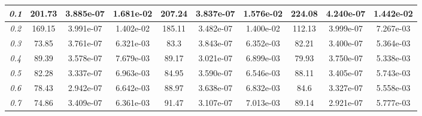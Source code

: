 \documentclass[conference]{IEEEtran}
\begin{document}
\begin{table*}[!htbp]
{\begin{tabular}{llllllllll}
    \multicolumn{1}{|c|}{\textit{ 0.1 }} & \multicolumn{1}{c|}{ 201.73 } & \multicolumn{1}{c|}{ 3.885e-07 } & \multicolumn{1}{c|}{ 1.681e-02 }& \multicolumn{1}{c|}{ 207.24 } & \multicolumn{1}{c|}{ 3.837e-07 } & \multicolumn{1}{c|}{ 1.576e-02 }& \multicolumn{1}{c|}{ 224.08 } & \multicolumn{1}{c|}{ 4.240e-07 } & \multicolumn{1}{c|}{ 1.442e-02 } \\ \hline
    \multicolumn{1}{|c|}{\textit{ 0.2 }} & \multicolumn{1}{c|}{ 169.15 } & \multicolumn{1}{c|}{ 3.991e-07 } & \multicolumn{1}{c|}{ 1.402e-02 }& \multicolumn{1}{c|}{ 185.11 } & \multicolumn{1}{c|}{ 3.482e-07 } & \multicolumn{1}{c|}{ 1.400e-02 }& \multicolumn{1}{c|}{ 112.13 } & \multicolumn{1}{c|}{ 3.999e-07 } & \multicolumn{1}{c|}{ 7.267e-03 } \\ \hline
    \multicolumn{1}{|c|}{\textit{ 0.3 }} & \multicolumn{1}{c|}{ 73.85 } & \multicolumn{1}{c|}{ 3.761e-07 } & \multicolumn{1}{c|}{ 6.321e-03 }& \multicolumn{1}{c|}{ 83.3 } & \multicolumn{1}{c|}{ 3.843e-07 } & \multicolumn{1}{c|}{ 6.352e-03 }& \multicolumn{1}{c|}{ 82.21 } & \multicolumn{1}{c|}{ 3.400e-07 } & \multicolumn{1}{c|}{ 5.364e-03 } \\ \hline
    \multicolumn{1}{|c|}{\textit{ 0.4 }} & \multicolumn{1}{c|}{ 89.39 } & \multicolumn{1}{c|}{ 3.578e-07 } & \multicolumn{1}{c|}{ 7.679e-03 }& \multicolumn{1}{c|}{ 89.17 } & \multicolumn{1}{c|}{ 3.021e-07 } & \multicolumn{1}{c|}{ 6.899e-03 }& \multicolumn{1}{c|}{ 79.93 } & \multicolumn{1}{c|}{ 3.750e-07 } & \multicolumn{1}{c|}{ 5.338e-03 } \\ \hline
    \multicolumn{1}{|c|}{\textit{ 0.5 }} & \multicolumn{1}{c|}{ 82.28 } & \multicolumn{1}{c|}{ 3.337e-07 } & \multicolumn{1}{c|}{ 6.963e-03 }& \multicolumn{1}{c|}{ 84.95 } & \multicolumn{1}{c|}{ 3.590e-07 } & \multicolumn{1}{c|}{ 6.546e-03 }& \multicolumn{1}{c|}{ 88.11 } & \multicolumn{1}{c|}{ 3.405e-07 } & \multicolumn{1}{c|}{ 5.743e-03 } \\ \hline
    \multicolumn{1}{|c|}{\textit{ 0.6 }} & \multicolumn{1}{c|}{ 78.43 } & \multicolumn{1}{c|}{ 2.942e-07 } & \multicolumn{1}{c|}{ 6.642e-03 }& \multicolumn{1}{c|}{ 88.97 } & \multicolumn{1}{c|}{ 3.638e-07 } & \multicolumn{1}{c|}{ 6.832e-03 }& \multicolumn{1}{c|}{ 84.6 } & \multicolumn{1}{c|}{ 3.327e-07 } & \multicolumn{1}{c|}{ 5.558e-03 } \\ \hline
    \multicolumn{1}{|c|}{\textit{ 0.7 }} & \multicolumn{1}{c|}{ 74.86 } & \multicolumn{1}{c|}{ 3.409e-07 } & \multicolumn{1}{c|}{ 6.361e-03 }& \multicolumn{1}{c|}{ 91.47 } & \multicolumn{1}{c|}{ 3.107e-07 } & \multicolumn{1}{c|}{ 7.013e-03 }& \multicolumn{1}{c|}{ 89.14 } & \multicolumn{1}{c|}{ 2.921e-07 } & \multicolumn{1}{c|}{ 5.777e-03 } \\ \hline

\end{tabular}}
\end{table*}
\end{document}
